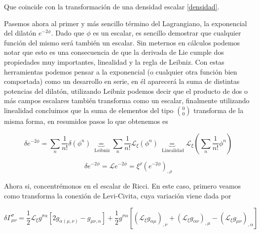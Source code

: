 \documentclass{article}
\numberwithin{equation}{section}
\begin{document}
Que coincide con la transformación de una densidad escalar \ref{densidad}.\\

\vspace{0.4cm}

Pasemos ahora al primer y más sencillo término del Lagrangiano, la exponencial del dilatón $ e^{-2\phi} $. Dado que $ \phi $ es un escalar, es sencillo demostrar que cualquier función del mismo será también un escalar. Sin meternos en cálculos podemos notar que esto es una consecuencia de que la derivada de Lie cumple dos propiedades muy importantes, linealidad y la regla de Leibniz. Con estas herramientas podemos pensar a la exponencial (o cualquier otra función bien comportada) como un desarrollo en serie, en él aparecerá la suma de distintas potencias del dilatón, utilizando Leibniz podemos decir que el producto de dos o más campos escalares también transforma como un escalar, finalmente utilizando linealidad concluimos que la suma de elementos del tipo $ \binom{0}{0} $ transforma de la misma forma, en resumidos pasos lo que obtenemos es

\begin{equation*}
\delta e^{-2 \phi} = \sum_n \frac{1}{n!} \delta ( \phi^n) \underbrace{=}_{\text{ Leibniz}} \sum_n \frac{1}{n!} \mathcal{L}_{\xi} ( \phi^n)\underbrace{=}_{\text{ Linealidad}} \mathcal{L}_{\xi} \left( \sum_n \frac{1}{n!} \phi^n \right)
\end{equation*} 

\begin{boxquation}
\begin{equation}\label{res2}
\delta e^{-2 \phi} = \mathcal{L} e^{-2\phi} = \xi^{\rho}\left(e^{-2\phi}\right)_{,\rho}
\end{equation}
\end{boxquation}

\vspace{0.6cm}

Ahora si, concentrémonos en el escalar de Ricci. En este caso, primero veamos como transforma la conexión de Levi-Civita, cuya variación viene dada por

\begin{equation}\label{gamadifeo}
\delta \Gamma^{\sigma}_{\mu \nu} = \frac{1}{2}\mathcal{L}_{\xi} g^{\sigma \alpha}\left[ 2g_{\alpha (\mu,\nu)} - g_{\mu\nu,\alpha}\right] + \frac{1}{2}g^{\sigma \alpha}\left[ \left(\mathcal{L}_{\xi} g_{\alpha \mu}\right)_{,\nu} + \left(\mathcal{L}_{\xi} g_{\alpha \nu}\right)_{,\mu} - \left(\mathcal{L}_{\xi}g_{\mu\nu}\right)_{,\alpha}\right]
\end{equation} 
\end{document}
